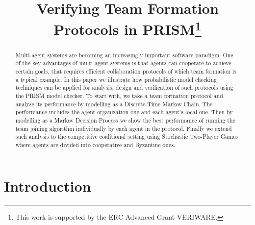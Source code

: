 \documentclass{llncs}
\newcommand{\comment}[1]{{\color{red}{[\sf #1]}}}
\begin{document}
\title{Verifying Team Formation Protocols in PRISM\thanks{This work is supported by
the ERC Advanced Grant VERIWARE.}}
\author{}
\email{}

\maketitle

\begin{abstract}
Multi-agent systems are becoming an increasingly important software paradigm. One of the key advantages of multi-agent systems is that agents can cooperate to achieve certain goals, that requires efficient collaboration protocols of which team formation is a typical example. In this paper we illustrate how probabilistic model checking techniques can be applied for analysis, design and verification of such protocols using the PRISM model checker. To start with, we take a team formation protocol and analyse its performance by modelling as a Discrete-Time Markov Chain. The performance includes the agent organization one and each agent's local one. Then by modelling as a Markov Decision Process we show %
the best performance %
of running the team joining algorithm individually by each agent in the protocol. Finally we extend such analysis to the competitive coalitional setting using Stochastic Two-Player Games where agents are divided into cooperative and Byzantine ones.
\end{abstract}

\section{Introduction}

\comment{will need a high-level description of PMC in intro, so put this here. Add some comments about complexity}
%
\end{document}
